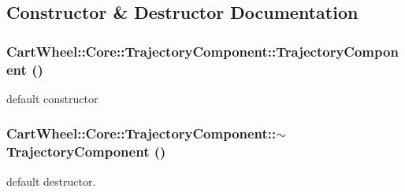 \subsection{Constructor \& Destructor Documentation}
\hypertarget{classCartWheel_1_1Core_1_1TrajectoryComponent_a3ce585a4c61f32e6293ab6d200ce1ed3}{
\subsubsection[{TrajectoryComponent}]{\setlength{\rightskip}{0pt plus 5cm}CartWheel::Core::TrajectoryComponent::TrajectoryComponent ()}}
\label{classCartWheel_1_1Core_1_1TrajectoryComponent_a3ce585a4c61f32e6293ab6d200ce1ed3}
default constructor \hypertarget{classCartWheel_1_1Core_1_1TrajectoryComponent_a6d6f6955cd8b3812c19c245a710a3eea}{
\subsubsection[{$\sim$TrajectoryComponent}]{\setlength{\rightskip}{0pt plus 5cm}CartWheel::Core::TrajectoryComponent::$\sim$TrajectoryComponent ()}}
\label{classCartWheel_1_1Core_1_1TrajectoryComponent_a6d6f6955cd8b3812c19c245a710a3eea}
default destructor. 

